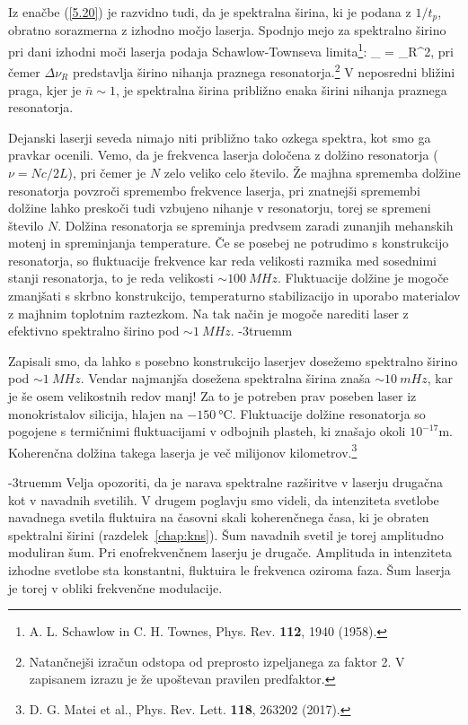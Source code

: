 Iz enačbe (\ref{5.20}) je razvidno tudi, da je spektralna širina, ki je
podana z $1/t_{p}$, obratno sorazmerna z izhodno močjo laserja. Spodnjo
mejo za spektralno širino pri dani izhodni moči laserja 
podaja Schawlow-Townseva limita\footnote{A. 
L. Schawlow in C. H. Townes, Phys. Rev. {\bf 112}, 1940 (1958).}:
\beq
\Delta \nu_ =  \Delta \nu_R^2,
\eeq
pri čemer $\Delta \nu_R$ predstavlja širino nihanja praznega 
resonatorja.\footnote{Natančnejši izračun odstopa od preprosto izpeljanega za 
faktor 2. V zapisanem izrazu je že upoštevan pravilen predfaktor.}
V neposredni bližini praga, kjer je $\overline{n}\sim 1$, je 
spektralna širina približno enaka širini nihanja praznega resonatorja.

Dejanski laserji seveda nimajo niti približno tako ozkega spektra, kot smo ga
pravkar ocenili. Vemo, da je frekvenca laserja določena z dolžino resonatorja 
($\nu=N c/2L$), pri čemer je $N$ zelo veliko celo število. Že majhna
sprememba dolžine resonatorja povzroči spremembo frekvence laserja, pri 
znatnejši spremembi dolžine lahko preskoči tudi vzbujeno
nihanje v resonatorju, torej se spremeni število $N$. Dolžina resonatorja se 
spreminja predvsem zaradi zunanjih mehanskih motenj in spreminjanja
temperature. Če se posebej ne potrudimo s konstrukcijo resonatorja, so 
fluktuacije frekvence kar reda velikosti razmika med sosednimi stanji 
resonatorja, to je reda velikosti $\sim 100~\si{MHz}$. 
Fluktuacije dolžine je mogoče zmanjšati s skrbno konstrukcijo, 
temperaturno stabilizacijo in uporabo materialov z majhnim toplotnim raztezkom. 
Na tak način je mogoče narediti laser z efektivno spektralno širino pod $\sim 1~\si{MHz}$.
\vglue-3truemm
\begin{remark}
Zapisali smo, da lahko s posebno konstrukcijo laserjev dosežemo
spektralno širino pod $\sim 1~\si{MHz}$. Vendar najmanjša dosežena 
spektralna širina znaša $\sim 10~\si{mHz}$, kar je še osem
velikostnih redov manj! Za to je potreben prav poseben 
laser iz monokristalov silicija, hlajen na $-150~\si{\celsius}$. Fluktuacije
dolžine resonatorja so pogojene s termičnimi fluktuacijami v odbojnih plasteh, 
ki znašajo okoli $10^{-17}\si{\metre}$. Koherenčna dolžina takega laserja je več
milijonov kilometrov.\footnote{D. G. Matei et al., Phys. Rev. Lett. {\bf 118}, 263202 (2017).} 
\end{remark}
\vglue-3truemm
Velja opozoriti, da je narava spektralne razširitve v laserju 
drugačna kot v navadnih svetilih. V drugem poglavju smo videli, da 
intenziteta svetlobe navadnega svetila fluktuira na časovni skali 
koherenčnega časa, ki je obraten spektralni širini (razdelek~\ref{chap:kns}). 
Šum navadnih svetil je torej amplitudno moduliran šum. Pri 
enofrekvenčnem laserju je drugače. Amplituda in intenziteta 
izhodne svetlobe sta konstantni, fluktuira le frekvenca oziroma
faza. Šum laserja je torej v obliki frekvenčne modulacije.

